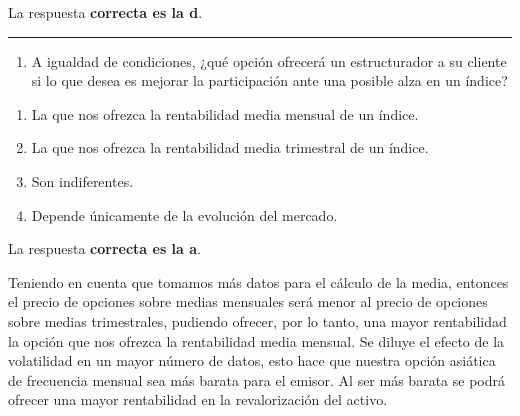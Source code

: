 \documentclass[
  letterpaper,
  DIV=11,
  numbers=noendperiod]{scrreprt}
\providecommand{\tightlist}{%
  \setlength{\itemsep}{0pt}\setlength{\parskip}{0pt}}\usepackage{longtable,booktabs,array}
\begin{document}
\begin{tcolorbox}[enhanced jigsaw, left=2mm, opacityback=0, colback=white, breakable, arc=.35mm, bottomrule=.15mm, rightrule=.15mm, toprule=.15mm, leftrule=.75mm, colframe=quarto-callout-tip-color-frame]
\begin{minipage}[t]{5.5mm}
\textcolor{quarto-callout-tip-color}{\faLightbulb}
\end{minipage}%
\begin{minipage}[t]{\textwidth - 5.5mm}

La respuesta \textbf{correcta es la d}.

\end{minipage}%
\end{tcolorbox}

\begin{center}\rule{0.5\linewidth}{0.5pt}\end{center}

\begin{enumerate}
\def\labelenumi{\arabic{enumi}.}
\setcounter{enumi}{37}
\tightlist
\item
  A igualdad de condiciones, ¿qué opción ofrecerá un estructurador a su
  cliente si lo que desea es mejorar la participación ante una posible
  alza en un índice?
\end{enumerate}

\begin{enumerate}
\def\labelenumi{\alph{enumi})}
\item
  La que nos ofrezca la rentabilidad media mensual de un índice.
\item
  La que nos ofrezca la rentabilidad media trimestral de un índice.
\item
  Son indiferentes.
\item
  Depende únicamente de la evolución del mercado.
\end{enumerate}

\begin{tcolorbox}[enhanced jigsaw, left=2mm, opacityback=0, colback=white, breakable, arc=.35mm, bottomrule=.15mm, rightrule=.15mm, toprule=.15mm, leftrule=.75mm, colframe=quarto-callout-tip-color-frame]
\begin{minipage}[t]{5.5mm}
\textcolor{quarto-callout-tip-color}{\faLightbulb}
\end{minipage}%
\begin{minipage}[t]{\textwidth - 5.5mm}

La respuesta \textbf{correcta es la a}.

Teniendo en cuenta que tomamos más datos para el cálculo de la media,
entonces el precio de opciones sobre medias mensuales será menor al
precio de opciones sobre medias trimestrales, pudiendo ofrecer, por lo
tanto, una mayor rentabilidad la opción que nos ofrezca la rentabilidad
media mensual. Se diluye el efecto de la volatilidad en un mayor número
de datos, esto hace que nuestra opción asiática de frecuencia mensual
sea más barata para el emisor. Al ser más barata se podrá ofrecer una
mayor rentabilidad en la revalorización del activo.

\end{minipage}%
\end{tcolorbox}
\end{document}
